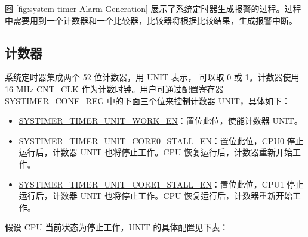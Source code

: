 \documentclass[main\_\_CN.tex]{subfiles}
\begin{document}
图 \ref{fig:system-timer-Alarm-Generation} 展示了系统定时器生成报警的过程。过程中需要用到一个计数器和一个比较器，比较器将根据比较结果，生成报警中断。


\subsection{计数器}
系统定时器集成两个 52 位计数器，用 UNIT 表示， 可以取 0 或 1。计数器使用 16 MHz CNT\_CLK 作为计数时钟。用户可通过配置寄存器 \hyperref[regdesc:SYSTIMERCONFREG]{SYSTIMER\_CONF\_REG} 中的下面三个位来控制计数器 UNIT，具体如下：
\begin{itemize}
    \item \hyperref[fielddesc:SYSTIMERTIMERUNIT1WORKEN]{SYSTIMER\_TIMER\_UNIT\_WORK\_EN}：置位此位，使能计数器 UNIT。
    \item \hyperref[fielddesc:SYSTIMERTIMERUNIT1CORE0STALLEN]{SYSTIMER\_TIMER\_UNIT\_CORE0\_STALL\_EN}：置位此位，CPU0 停止运行后，计数器 UNIT 也将停止工作。CPU 恢复运行后，计数器重新开始工作。
    \item \hyperref[fielddesc:SYSTIMERTIMERUNIT1CORE0STALLEN]{SYSTIMER\_TIMER\_UNIT\_CORE1\_STALL\_EN}：置位此位，CPU1 停止运行后，计数器 UNIT 也将停止工作。CPU 恢复运行后，计数器重新开始工作。
\end{itemize}



假设 CPU 当前状态为停止工作，UNIT 的具体配置见下表：
\end{document}

